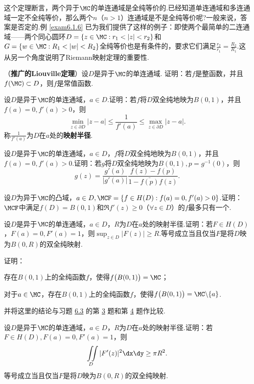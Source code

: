 这个定理断言，两个异于$\MC$的单连通域是全纯等价的.已经知道单连通域和多连通域一定不全纯等价，那么两个$n$（$n>1$）连通域是不是全纯等价呢?一般来说，答案是否定的.例 \ref{exam6.1.6} 已为我们提供了这样的例子：即使两个最简单的二连通域——两个同心圆环$D=\{z\in\MC:r_1<|z|<r_2\}$和$G=\{w\in\MC:R_1<|w| <R_2\}$全纯等价也是有条件的，要求它们满足$\frac{r_2}{r_1}=\frac{R_2}{R_1}$.这从另一个角度说明了Riemann映射定理的重要性.

\begin{xiti}\hypertarget{xiti7.2}{}
\item （\textbf{推广的Liouville定理}）设$D$是异于$\MC$的单连通域. 证明：若$f$是整函数，并且$f(\MC)\subset D$，则$f$是常值函数.
\item 设$D$是异于$\MC$的单连通域，$a\in D$.证明：若$f$将$D$双全纯地映为$B(0,1)$，并且$f(a)=0,f'(a)>0$，则
    \[\min_{z\in\partial D}|z-a|\le\frac1{f'(a)}\le\max_{z\in\partial D}|z-a|.\]
称$\frac1{f'(a)}$为$D$在$a$处的\textbf{映射半径}.
\item 设$D$是异于$\MC$的单连通域，$a\in D$，$f$将$D$双全纯地映为$B(0,1)$，并且$f(a)=0,f'(a)>0$.证明：若$g$将$D$双全纯地映为$B(0,1),p=g^{-1}(0)$，则
    \[g(z)=\frac{g'(a)}{|g'(a)|}\frac{f(z)-f(p)}{1-\bar{f(p)}f(z)}.\]
\item 设$D$为异于$\MC$的凸域，$a\in D,\MCF=\{f\in H(D):f(a)=0,f'(a)>0\}$.证明：$\MCF$中满足$f(D)=B(0,1)$和$\Re f'(z)\ge0$（$\forall z\in D$）的$f$最多只有一个.
\item 设$D$是异于$\MC$的单连通域，$a\in D$，$R$为$D$在$a$处的映射半径.证明：若$F\in H(D) $，$F(a)=0,F'(a)=1$，则$\sup_{z\in D}|F(z)|\ge R$.等号成立当且仅当$F$是将$D$映为$B(0,R)$的双全纯映射.
\item 证明：
\begin{enuma}
  \item 存在$B(0,1)$上的全纯函数$f$，使得$f\big(B(0,1)\big)=\MC$；
  \item 对于$a\in \MC$，存在$B(0,1)$上的全纯函数$f$，使得$f\big(B(0,1)\big)=\MC\backslash\{a\}$.
\end{enuma}
      并将这里的结论与习题 \hyperlink{xiti6.3}{6.3} 的第 \hyperlink{xiti6.3.3}{3} 题和第 \hyperlink{xiti6.3.3}{4} 题作比较.
\item 设$D$是异于$\MC$的单连通域，$a\in D$，$R$为$D$在$a$处的映射半径.证明：若$F\in H(D),F(a)=0,F'(a)=1$，则
    \[\iint\limits_D|F'(z)|^2\dx\dy\ge\pi R^2.\]
等号成立当且仅当$F$是将$D$映为$B(0,R)$的双全纯映射.
\end{xiti}

